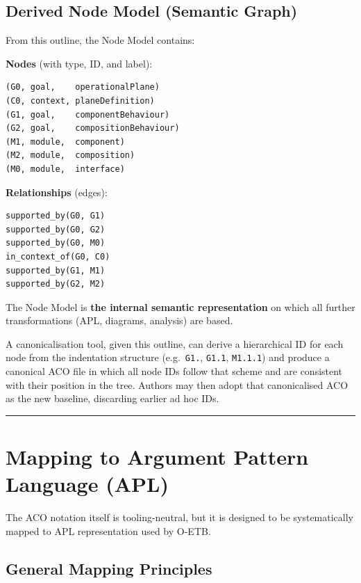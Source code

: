 \documentclass[11pt,twoside,a4paper]{article}
\begin{document}
\subsection{Derived Node Model (Semantic Graph)}

From this outline, the Node Model contains:

\textbf{Nodes} (with type, ID, and label):
\begin{verbatim}
(G0, goal,    operationalPlane)
(C0, context, planeDefinition)
(G1, goal,    componentBehaviour)
(G2, goal,    compositionBehaviour)
(M1, module,  component)
(M2, module,  composition)
(M0, module,  interface)
\end{verbatim}

\textbf{Relationships} (edges):
\begin{verbatim}
supported_by(G0, G1)
supported_by(G0, G2)
supported_by(G0, M0)
in_context_of(G0, C0)
supported_by(G1, M1)
supported_by(G2, M2)
\end{verbatim}

The Node Model is \textbf{the internal semantic representation} on which all further transformations (APL, diagrams, analysis) are based.

A canonicalisation tool, given this outline, can derive a hierarchical ID for each node from the indentation structure (e.g.\ \texttt{G1.}, \texttt{G1.1}, \texttt{M1.1.1}) and produce a canonical ACO file in which all node IDs follow that scheme and are consistent with their position in the tree. Authors may then adopt that canonicalised ACO as the new baseline, discarding earlier ad hoc IDs.

\bigskip
\hrule
\bigskip

\section{Mapping to Argument Pattern Language (APL)}

The ACO notation itself is tooling-neutral, but it is designed to be systematically mapped to APL representation used by O-ETB.

\subsection{General Mapping Principles}
\end{document}

